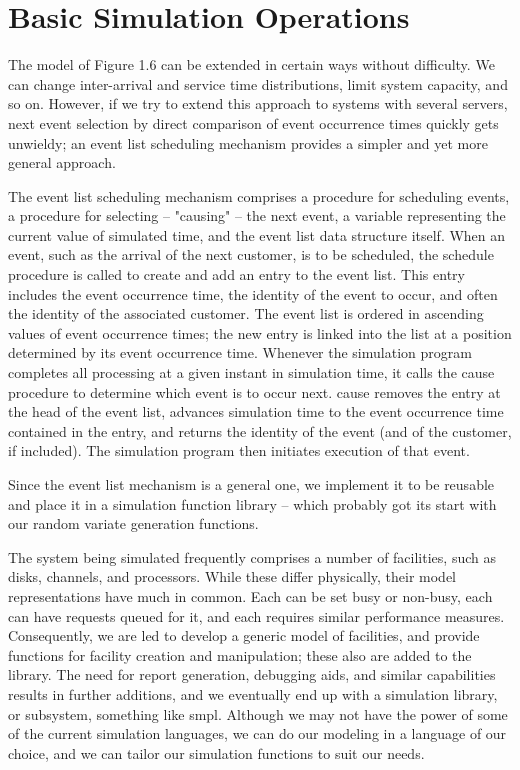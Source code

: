 \section{Basic Simulation Operations}
\label{sec:basic-simulation-operations}

The model of Figure 1.6 can be extended in certain ways without difficulty. We
can change inter-arrival and service time distributions, limit system capacity,
and so on. However, if we try to extend this approach to systems with several
servers, next event selection by direct comparison of event occurrence times
quickly gets unwieldy; an event list scheduling mechanism provides a simpler
and yet more general approach.

The event list scheduling mechanism comprises a procedure for scheduling
events, a procedure for selecting -- "causing" -- the next event, a variable
representing the current value of simulated time, and the event list data
structure itself. When an event, such as the arrival of the next customer, is
to be scheduled, the schedule procedure is called to create and add an entry to
the event list. This entry includes the event occurrence time, the identity of
the event to occur, and often the identity of the associated customer. The
event list is ordered in ascending values of event occurrence times; the new
entry is linked into the list at a position determined by its event occurrence
time. Whenever the simulation program completes all processing at a given
instant in simulation time, it calls the cause procedure to determine which
event is to occur next. cause removes the entry at the head of the event list,
advances simulation time to the event occurrence time contained in the entry,
and returns the identity of the event (and of the customer, if included). The
simulation program then initiates execution of that event.

Since the event list mechanism is a general one, we implement it to be reusable
and place it in a simulation function library -- which probably got its start
with our random variate generation functions.

The system being simulated frequently comprises a number of facilities, such
as disks, channels, and processors. While these differ physically, their model
representations have much in common. Each can be set busy or non-busy, each can
have requests queued for it, and each requires similar performance measures.
Consequently, we are led to develop a generic model of facilities, and provide
functions for facility creation and manipulation; these also are added to the
library. The need for report generation, debugging aids, and similar
capabilities results in further additions, and we eventually end up with a
simulation library, or subsystem, something like smpl. Although we may not have
the power of some of the current simulation languages, we can do our modeling
in a language of our choice, and we can tailor our simulation functions to suit
our needs.

